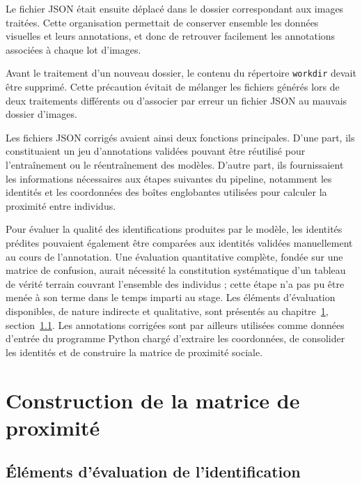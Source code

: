 \documentclass[11pt,a4paper]{report}
\begin{document}
Le fichier JSON était ensuite déplacé dans le dossier correspondant aux images
traitées. Cette organisation permettait de conserver ensemble les données
visuelles et leurs annotations, et donc de retrouver facilement les
annotations associées à chaque lot d'images.

Avant le traitement d'un nouveau dossier, le contenu du répertoire
\texttt{workdir} devait être supprimé. Cette précaution évitait de mélanger les
fichiers générés lors de deux traitements différents ou d'associer par erreur
un fichier JSON au mauvais dossier d'images.

Les fichiers JSON corrigés avaient ainsi deux fonctions principales. D'une
part, ils constituaient un jeu d'annotations validées pouvant être réutilisé
pour l'entraînement ou le réentraînement des modèles. D'autre part, ils
fournissaient les informations nécessaires aux étapes suivantes du pipeline,
notamment les identités et les coordonnées des boîtes englobantes utilisées
pour calculer la proximité entre individus.

Pour évaluer la qualité des identifications produites par le modèle, les
identités prédites pouvaient également être comparées aux identités validées
manuellement au cours de l'annotation. Une évaluation quantitative complète,
fondée sur une matrice de confusion, aurait nécessité la constitution
systématique d'un tableau de vérité terrain couvrant l'ensemble des individus ;
cette étape n'a pas pu être menée à son terme dans le temps imparti au stage.
Les éléments d'évaluation disponibles, de nature indirecte et qualitative, sont
présentés au chapitre~\ref{chap:proximite},
section~\ref{sec:eval-application}. Les annotations corrigées sont par ailleurs
utilisées comme données d'entrée du programme Python chargé d'extraire les
coordonnées, de consolider les identités et de construire la matrice de
proximité sociale.


\chapter{Construction de la matrice de proximité}
\label{chap:proximite}


\section{Éléments d'évaluation de l'identification}
\label{sec:eval-application}
\end{document}
